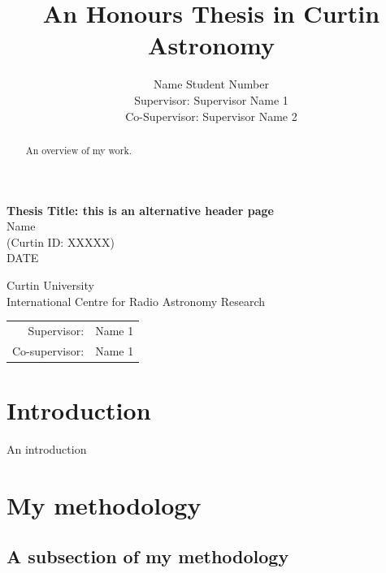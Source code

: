 \documentclass[a4paper,12pt,titlepage]{article}
\title{An Honours Thesis in Curtin Astronomy}
\author{Name Student Number\\Supervisor: Supervisor Name 1\\Co-Supervisor: Supervisor Name 2}
\begin{document}
\maketitle



\clearpage
\thispagestyle{empty}

\begin{minipage}[H]{\textwidth}
\begin{center}
 {\LARGE \textbf{Thesis Title: this is an alternative header page}}
 \\[1.5cm]
 {\Large 
 Name}\\[0.07cm]
 {\large
 (Curtin ID: XXXXX})\\[0.5cm]
 {\Large
 DATE \\[2cm]}
 {\Large
 Curtin University\\
 International Centre for Radio Astronomy Research\\[0.5cm]
 \begin{tabular}{rl}
 Supervisor:& Name 1\\
 Co-supervisor:& Name 1
 \end{tabular}}
 \end{center}
 \end{minipage}


\newpage
\tableofcontents
\newpage
\begin{abstract}

An overview of my work.


\end{abstract}

\newpage

\setcounter{page}{1}
\section{Introduction}\label{sec:intro}


An introduction

\section{My methodology}


\subsection{A subsection of my methodology}
\end{document}
